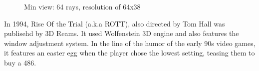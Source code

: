    \begin{figure}[H]
\centering
 \caption{Min view: 64 rays, resolution of 64x38}
 \end{figure}
 \par

In 1994, Rise Of the Trial (a.k.a ROTT), also directed by Tom Hall was publisehd by 3D Reams. It used Wolfenstein 3D engine and also features the window adjustment system. In the line of the humor of the early 90s video games, it features an easter egg when the player chose the lowest setting, teasing them to buy a 486.
    \begin{figure}[H]
\centering
 \end{figure}
 \par